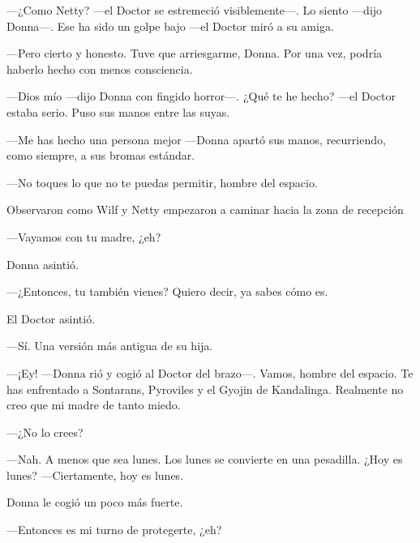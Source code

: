 ---¿Como Netty? ---el Doctor se estremeció visiblemente---. Lo siento
---dijo Donna---. Ese ha sido un golpe bajo ---el Doctor miró a su
amiga.

---Pero cierto y honesto. Tuve que arriesgarme, Donna. Por una vez,
podría haberlo hecho con menos consciencia.

---Dios mío ---dijo Donna con fingido horror---. ¿Qué te he hecho? ---el
Doctor estaba serio. Puso sus manos entre las suyas.

---Me has hecho una persona mejor ---Donna apartó sus manos,
recurriendo, como siempre, a sus bromas estándar.

---No toques lo que no te puedas permitir, hombre del espacio.

Observaron como Wilf y Netty empezaron a caminar hacia la zona de
recepción

---Vayamos con tu madre, ¿eh?

Donna asintió.

---¿Entonces, tu también vienes? Quiero decir, ya sabes cómo es.

El Doctor asintió.

---Sí. Una versión más antigua de su hija.

---¡Ey! ---Donna rió y cogió al Doctor del brazo---. Vamos, hombre del
espacio. Te has enfrentado a Sontarans, Pyroviles y el Gyojin de
Kandalinga. Realmente no creo que mi madre de tanto miedo.

---¿No lo crees?

---Nah. A menos que sea lunes. Los lunes se convierte en una pesadilla.
¿Hoy es lunes? ---Ciertamente, hoy es lunes.

Donna le cogió un poco más fuerte.

---Entonces es mi turno de protegerte, ¿eh?